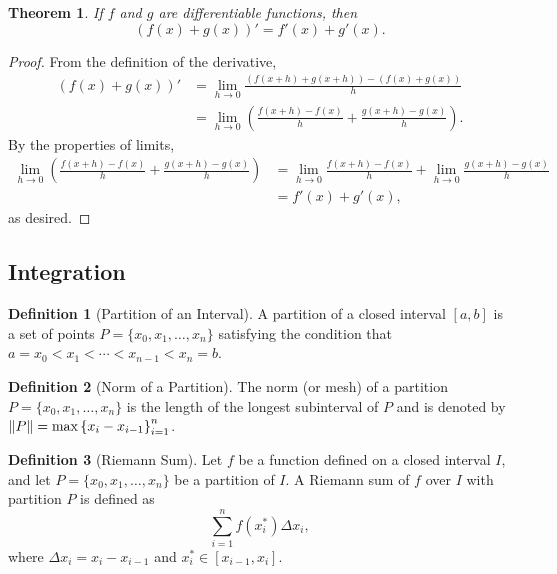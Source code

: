 \documentclass[headings=standardclasses]{scrartcl}
\newtheorem{theorem}{Theorem}[subsection]
\theoremstyle{definition}
\newtheorem{definition}{Definition}[subsection]
\begin{document}
\begin{theorem}
  If \(f\) and \(g\) are differentiable functions, then
  \[ (f(x) + g(x))' = f'(x) + g'(x). \]
\end{theorem}

\begin{proof}
  From the definition of the derivative,
  \begin{equation*}
  \begin{split}
    (f(x) + g(x))' &= \lim_{h → 0} \frac{(f(x + h) + g(x + h)) - (f(x) + g(x))}{h} \\
                   &= \lim_{h → 0} \left(\frac{f(x + h) - f(x)}{h} + \frac{g(x + h) - g(x)}{h}\right).
  \end{split}
  \end{equation*}
  By the properties of limits,
  \begin{equation*}
  \begin{split}
    \lim_{h → 0} \left(\frac{f(x + h) - f(x)}{h} + \frac{g(x + h) - g(x)}{h}\right) &= \lim_{h → 0} \frac{f(x + h) - f(x)}{h} + \lim_{h → 0} \frac{g(x + h) - g(x)}{h} \\
                                                                                    &= f'(x) + g'(x),
  \end{split}
  \end{equation*}
  as desired.
\end{proof}

\subsection{Integration}

\begin{definition}[Partition of an Interval]
  A partition of a closed interval \([a, b]\) is a set of points \(P = \{x_0,
  x_1, \ldots, x_n\}\) satisfying the condition that \(a = x_0 < x_1 < \cdots <
  x_{n - 1} < x_n = b\).
\end{definition}

\begin{definition}[Norm of a Partition]
  The norm (or mesh) of a partition \(P = \{x_0, x_1, \ldots, x_n\}\) is the
  length of the longest subinterval of \(P\) and is denoted by \(\lVert P\rVert =
  \max{\{ x_i - x_{i - 1} \}}_{i = 1}^n\).
\end{definition}

\begin{definition}[Riemann Sum]
  Let \(f\) be a function defined on a closed interval \(I\), and let \(P =
  \{x_0, x_1, \ldots, x_n\}\) be a partition of \(I\). A Riemann sum of \(f\)
  over \(I\) with partition \(P\) is defined as \[ ∑_{i = 1}^n f(x^*_i) Δx_i,
  \] where \(Δx_i = x_i - x_{i - 1}\) and \(x^*_i ∈ [x_{i - 1}, x_i]\).
\end{definition}
\end{document}
